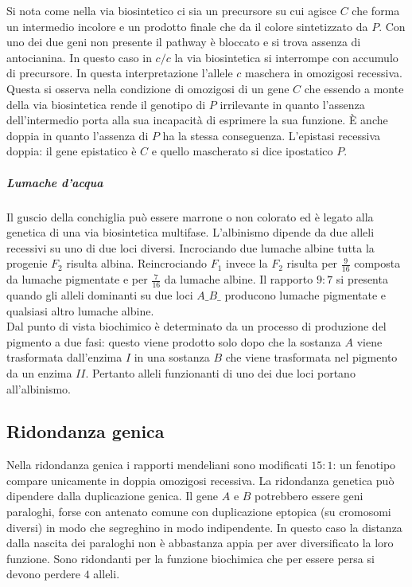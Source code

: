 Si nota come nella via biosintetico ci sia un precursore su cui agisce $C$ che forma un intermedio incolore e un prodotto finale che da il colore sintetizzato da $P$. Con uno dei
due geni non presente il pathway \`e bloccato e si trova assenza di antocianina. In questo caso in $c/c$ la via biosintetica si interrompe con accumulo di precursore. In questa 
interpretazione l'allele $c$ maschera in omozigosi recessiva. Questa si osserva nella condizione di omozigosi di un gene $C$ che essendo a monte della via biosintetica rende il 
genotipo di $P$ irrilevante in quanto l'assenza dell'intermedio porta alla sua incapacit\`a di esprimere la sua funzione. \`E anche doppia in quanto l'assenza di $P$ ha la stessa
conseguenza. L'epistasi recessiva doppia: il gene epistatico \`e $C$ e quello mascherato si dice ipostatico $P$. \\
\subparagraph{Lumache d'acqua}
Il guscio della conchiglia  pu\`o essere marrone o non colorato ed \`e legato alla genetica di una via biosintetica multifase. L'albinismo dipende da due alleli recessivi su uno di due loci diversi. 
Incrociando due lumache albine tutta la progenie $F_2$ risulta albina. Reincrociando $F_1$ invece la $F_2$ risulta per $\frac{9}{16}$ composta da lumache pigmentate e per $\frac{7}{16}$ da lumache 
albine. Il rapporto $9:7$ si presenta quando gli alleli dominanti su due loci $A\_B\_$ producono lumache pigmentate e qualsiasi altro lumache albine.\\
Dal punto di vista biochimico \`e determinato da un processo di produzione del pigmento a due fasi: questo viene prodotto solo dopo che la sostanza $A$ viene trasformata dall'enzima $I$ in una sostanza
$B$ che viene trasformata nel pigmento da un enzima $II$. Pertanto alleli funzionanti di uno dei due loci portano all'albinismo. 

\subsection{Ridondanza genica}
Nella ridondanza genica i rapporti mendeliani sono modificati $15:1$: un fenotipo compare unicamente in doppia omozigosi recessiva. La ridondanza genetica pu\`o dipendere dalla
duplicazione genica. Il gene $A$ e $B$ potrebbero essere geni paraloghi, forse con antenato comune con duplicazione eptopica (su cromosomi diversi) in modo che segreghino in modo
indipendente. In questo caso la distanza dalla nascita dei paraloghi non \`e abbastanza appia per aver diversificato la loro funzione. Sono ridondanti per la funzione biochimica che
per essere persa si devono perdere $4$ alleli. 
